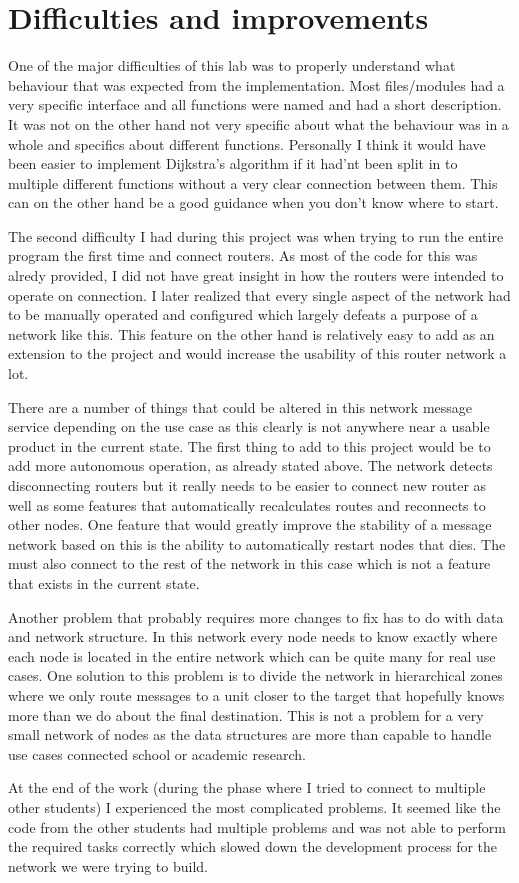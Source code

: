\chapter{Difficulties and improvements}

One of the major difficulties of this lab was to properly understand what behaviour that was expected from the implementation. Most files/modules had a very specific interface and all functions were named and had a short description. It was not on the other hand not very specific about what the behaviour was in a whole and specifics about different functions. Personally I think it would have been easier to implement Dijkstra's algorithm if it had'nt been split in to multiple different functions without a very clear connection between them. This can on the other hand be a good guidance when you don't know where to start.

The second difficulty I had during this project was when trying to run the entire program the first time and connect routers. As most of the code for this was alredy provided, I did not have great insight in how the routers were intended to operate on connection. I later realized that every single aspect of the network had to be manually operated and configured which largely defeats a purpose of a network like this. This feature on the other hand is relatively easy to add as an extension to the project and would increase the usability of this router network a lot. 

There are a number of things that could be altered in this network message service depending on the use case as this clearly is not anywhere near a usable product in the current state. The first thing to add to this project would be to add more autonomous operation, as already stated above. The network detects disconnecting routers but it really needs to be easier to connect new router as well as some features that automatically recalculates routes and reconnects to other nodes. One feature that would greatly improve the stability of a message network based on this is the ability to automatically restart nodes that dies. The must also connect to the rest of the network in this case which is not a feature that exists in the current state. 

Another problem that probably requires more changes to fix has to do with data and network structure. In this network every node needs to know exactly where each node is located in the entire network which can be quite many for real use cases. One solution to this problem is to divide the network in hierarchical zones where we only route messages to a unit closer to the target that hopefully knows more than we do about the final destination. This is not a problem for a very small network of nodes as the data structures are more than capable to handle use cases connected school or academic research.

At the end of the work (during the phase where I tried to connect to multiple other students) I experienced the most complicated problems. It seemed like the code from the other students had multiple problems and was not able to perform the required tasks correctly which slowed down the development process for the network we were trying to build.
